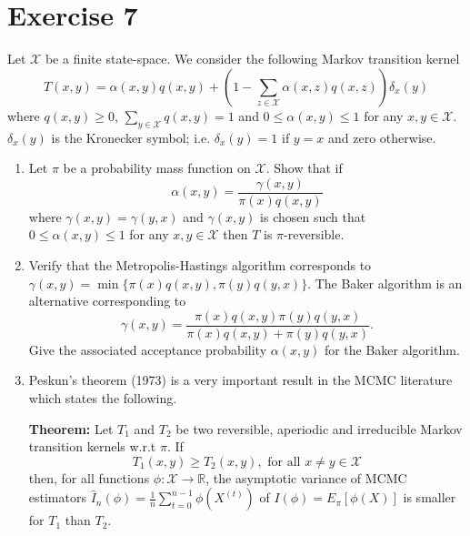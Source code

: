 
\section*{Exercise 7}
Let $\mathcal{X}$ be a finite state-space. We consider the following Markov transition kernel
\begin{equation*}
T (x, y) = \alpha (x, y) q (x, y) + \left(1 - \sum_{z\in\mathcal{X}} \alpha (x, z) q (x, z)\right) \delta_x (y)
\end{equation*}
where $q (x, y) \geq 0$, $\sum_{y\in\mathcal{X}} q (x, y) = 1$ and $0 \leq \alpha (x, y) \leq 1$ for any $x, y \in \mathcal{X}$. $\delta_x (y)$ is the Kronecker symbol; i.e. $\delta_x (y) = 1$ if $y = x$ and zero otherwise.

\begin{enumerate}
\item Let $\pi$ be a probability mass function on $\mathcal{X}$. Show that if
\begin{equation*}
\alpha (x, y) = \frac{\gamma (x, y)}{\pi (x) q (x, y)}
\end{equation*}
where $\gamma (x, y) = \gamma (y, x)$ and $\gamma (x, y)$ is chosen such that $0 \leq \alpha (x, y) \leq 1$ for any $x, y \in \mathcal{X}$ then $T$ is $\pi$-reversible.

\item Verify that the Metropolis-Hastings algorithm corresponds to $\gamma (x, y) = \min \{\pi (x) q (x, y), \pi (y) q (y, x)\}$. The Baker algorithm is an alternative corresponding to
\begin{equation*}
\gamma (x, y) = \frac{\pi (x) q (x, y) \pi (y) q (y, x)}{\pi (x) q (x, y) + \pi (y) q (y, x)}.
\end{equation*}
Give the associated acceptance probability $\alpha (x, y)$ for the Baker algorithm.

\item Peskun's theorem (1973) is a very important result in the MCMC literature which states the following.

\textbf{Theorem:} Let $T_1$ and $T_2$ be two reversible, aperiodic and irreducible Markov transition kernels w.r.t $\pi$. If
\begin{equation*}
T_1 (x, y) \geq T_2 (x, y) , \text{ for all } x \neq y \in \mathcal{X}
\end{equation*}
then, for all functions $\phi : \mathcal{X} \to \mathbb{R}$, the asymptotic variance of MCMC estimators $\hat{I}_n (\phi) = \frac{1}{n}\sum_{t=0}^{n-1} \phi\left(X^{(t)}\right)$ of $I (\phi) = E_\pi [\phi (X)]$ is smaller for $T_1$ than $T_2$.


\end{enumerate}
